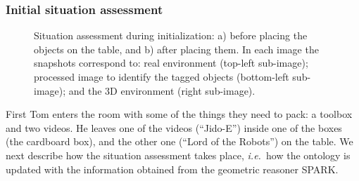 \documentclass[twocolumn]{svjour3}
\newcommand{\ie}{{\textit{i.e.~}}}
\begin{document}
\subsubsection{Initial situation assessment}

\begin{figure}[!t]
\centering
	\caption{Situation assessment during initialization: a) before placing the
	objects on the table, and b) after placing them. In each image the snapshots
	correspond to: real environment (top-left sub-image); processed image to
	identify the tagged objects (bottom-left sub-image); and the 3D environment
	(right sub-image).}
	\label{fig|sitAssessRoman}
\end{figure}

First Tom enters the room with some of the things they need to pack: a
toolbox and two videos. He leaves one of the videos (``Jido-E'') inside one of
the boxes (the cardboard box), and the other one (``Lord of the Robots'') on the
table. We next describe how the situation assessment takes place, \ie how the
ontology is updated with the information obtained from the geometric reasoner
SPARK.
\end{document}
